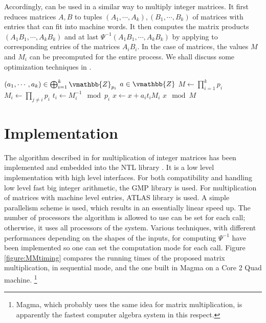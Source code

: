 Accordingly,  can be used in a similar way to multiply integer 
matrices. It first reduces matrices $A, B$ to tuples $(A_1, \cdots, A_k), (B_1, \cdots, B_k)$ of 
matrices with entries that can fit into machine words. It then computes the matrix products 
$(A_1B_1, \cdots, A_kB_k)$ and at last $\Psi^{-1}(A_1B_1, \cdots, A_kB_k)$ by applying 
to corresponding entries of the matrices $A_iB_i$. In the case of matrices, the values $M$ and $M_i$ 
can be precomputed for the entire process. We shall discuss  some optimization techniques in 
.

\begin{algorithm}
\label{algorithm:lZMul}
\begin{algorithmic}[1]
\REQUIRE $(a_1, \cdots, a_k) \in \bigoplus_{i = 1}^k \vmathbb{Z}_{p_i}$
\ENSURE  $a \in \vmathbb{Z}$
\STATE $M \leftarrow \prod_{i = 1}^k p_i$
	\STATE $M_i \leftarrow \prod_{j \ne i} p_i$
\ENDFOR
{}
\label{step:gauss-minv}
	\STATE $t_i \leftarrow M_i^{-1} \mod {p_i}$
	\STATE $x \leftarrow x + a_it_iM_i$
\ENDFOR
\RETURN $x \mod M$
\end{algorithmic}
\end{algorithm}










\section{Implementation}
\label{section:impl}

The algorithm described in  for multiplication of integer matrices has been 
implemented and embedded into the NTL library \cite{NTL2009}. It is a low level implementation with 
high level interfaces. For both compatibility and handling low level fast big integer arithmetic, 
the GMP library \cite{GMP2010} is used. For multiplication of matrices with machine level entries, 
ATLAS library \cite{ATLAS2010} is used. A simple parallelism scheme is used, which results in an 
essentially linear speed up. The number of processors the algorithm is allowed to use can be set for 
each call; otherwise, it uses all processors of the system. Various techniques, with different 
performances depending on the shapes of the inputs, for computing $\Psi^{-1}$ have been implemented 
so one can set the computation mode for each call. Figure \ref{figure:MMtiming} compares the running 
times of the proposed matrix multiplication, in sequential mode, and the one built in Magma 
\cite{Magma2010} on a Core 2 Quad machine. \footnote{Magma, which probably uses the same idea for 
matrix multiplication, is apparently the fastest computer algebra system in this respect.}


